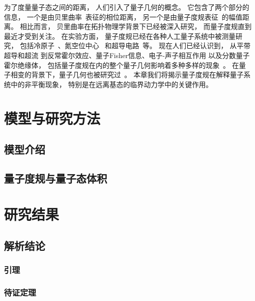 		为了度量量子态之间的距离， 人们引入了量子几何的概念。
		它包含了两个部分的信息， 一个是由贝里曲率~\cite{Bohm2003}表征的相位距离，  另一个是由量子度规表征~\cite{Provost1980,Matsuura2010,Ma2010b}的幅值距离。
		相比而言， 贝里曲率在拓扑物理学背景下已经被深入研究， 而量子度规直到最近才受到关注。
		在实验方面， 量子度规已经在各种人工量子系统中被测量研究， 包括冷原子~\cite{Yi2023}、氮空位中心~\cite{Yu2019} 和超导电路~\cite{Zheng2022}等。
		现在人们已经认识到， 从平带超导和超流\cite{Peotta2015,Julku2016,Peotta2023,Tian2023,Espinosa2024} 到反常霍尔效应\cite{Gianfrate2020,Wang2021,Gao2023}、量子Fisher信息\cite{Braunstein1994,Zanardi2007,Hauke2016}、电子-声子相互作用\cite{Yu2023} 以及分数量子霍尔绝缘体\cite{Parameswaran2013,Neupert2015,BMera2021,BMera20212}， 包括量子度规在内的整个量子几何影响着多种多样的现象~\cite{Torma2023}。
		在量子相变的背景下，量子几何也被研究过~\cite{CAROLLO20201}。
		本章我们将揭示量子度规在解释量子系统中的非平衡现象， 特别是在远离基态的临界动力学中的关键作用。

	\section{模型与研究方法}
	
		\subsection{模型介绍}
		
		\subsection{量子度规与量子态体积}

	\section{研究结果}
	
		\subsection{解析结论}

			\subsubsection{引理}
			
			\subsubsection{待证定理}


